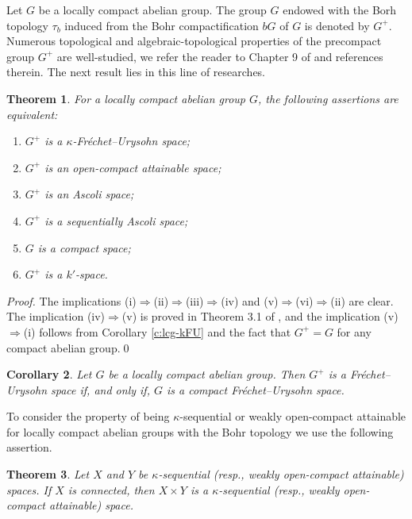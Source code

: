 \documentclass[preprint,11pt]{elsarticle}
\newtheorem{theorem}{Theorem}[section]
\newtheorem{corollary}[theorem]{Corollary}
\newtheorem{problem}[theorem]{Problem}
\numberwithin{equation}{section}
\numberwithin{theorem}{section}
\newcommand{\Ra}{\Rightarrow}
\begin{document}


Let $G$ be a locally compact abelian group. The group $G$ endowed with the Borh topology $\tau_b$ induced from the Bohr compactification $bG$ of $G$ is denoted by $G^+$. Numerous topological and algebraic-topological properties of the precompact group $G^+$ are well-studied, we refer the reader to Chapter 9 of \cite{ArT} and references therein. The next result lies in this line of researches.


\begin{theorem} \label{t:LCA-Bohr-kFU}
For a locally compact abelian group $G$, the following assertions are equivalent:
\begin{enumerate}
\item[{\rm(i)}] $G^+$ is a $\kappa$-Fr\'{e}chet--Urysohn space;
\item[{\rm(ii)}] $G^+$ is an open-compact attainable space;
\item[{\rm(iii)}] $G^+$ is an Ascoli space;
\item[{\rm(iv)}] $G^+$ is a sequentially Ascoli space;
\item[{\rm(v)}]  $G$ is a compact space;
\item[{\rm(vi)}] $G^+$ is a $k'$-space.
\end{enumerate}
\end{theorem}

\begin{proof}
The implications (i)$\Ra$(ii)$\Ra$(iii)$\Ra$(iv) and (v)$\Ra$(vi)$\Ra$(ii) are clear. The implication (iv)$\Ra$(v) is proved in Theorem 3.1 of \cite{Gabr-seq-Ascoli}, and the implication (v)$\Ra$(i) follows from Corollary \ref{c:lcg-kFU} and the fact that $G^+=G$ for any compact abelian group.\qed
\end{proof}

\begin{corollary} \label{c:LCA-Bohr-FU}
Let $G$ be a locally compact abelian group. Then  $G^+$ is a Fr\'{e}chet--Urysohn space if, and only if, $G$ is a compact Fr\'{e}chet--Urysohn space.
\end{corollary}


To consider the property of being $\kappa$-sequential or weakly open-compact attainable for locally compact abelian groups with the Bohr topology we use the following assertion.

\begin{theorem} \label{t:prod-kappa-connected}
Let $X$ and $Y$ be $\kappa$-sequential {\rm(}resp., weakly open-compact attainable{\rm)} spaces. If $X$ is connected, then $X\times Y$ is a $\kappa$-sequential {\rm(}resp., weakly open-compact attainable{\rm)} space.
\end{theorem}
\end{document}

